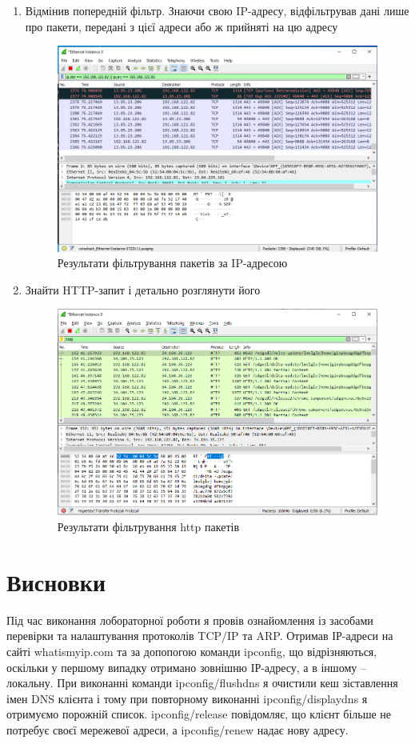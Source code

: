 \documentclass{article}
\begin{document}
\begin{normalsize}
\begin{enumerate}
\item Відмінив попередній фільтр. Знаючи свою IP-адресу, відфільтрував дані лише про пакети, передані з цієї адреси або ж прийняті на цю адресу
\begin{figure}[H]
	\centering
	\includegraphics[scale=0.5]{11}
	\caption{Результати фільтрування пакетів за IP-адресою}
\end{figure}
\item Знайти HTTP-запит і детально розглянути його
\begin{figure}[H]
	\centering
	\includegraphics[scale=0.5]{12}
	\caption{Результати фільтрування http пакетів}
\end{figure}
	\end{enumerate}

\section*{Висновки}
Під час виконання лобораторної роботи я провів ознайомлення із засобами перевірки та налаштування протоколів TCP/IP та ARP.
Отримав ІР-адреси на сайті whatismyip.com та за допопогою команди ipconfig, що відрізняються, оскільки у першому випадку отримано зовнішню ІР-адресу, а в іншому – локальну.
При виконанні команди ipconfig/flushdns я очистили кеш зіставлення імен DNS клієнта і тому при повторному виконанні ipconfig/displaydns я отримуємо порожній список.
ipconfig/release повідомляє, що клієнт більше не потребує своєї мережевої адреси, а ipconfig/renew надає нову адресу.
	    
\end{normalsize}
\end{document}
